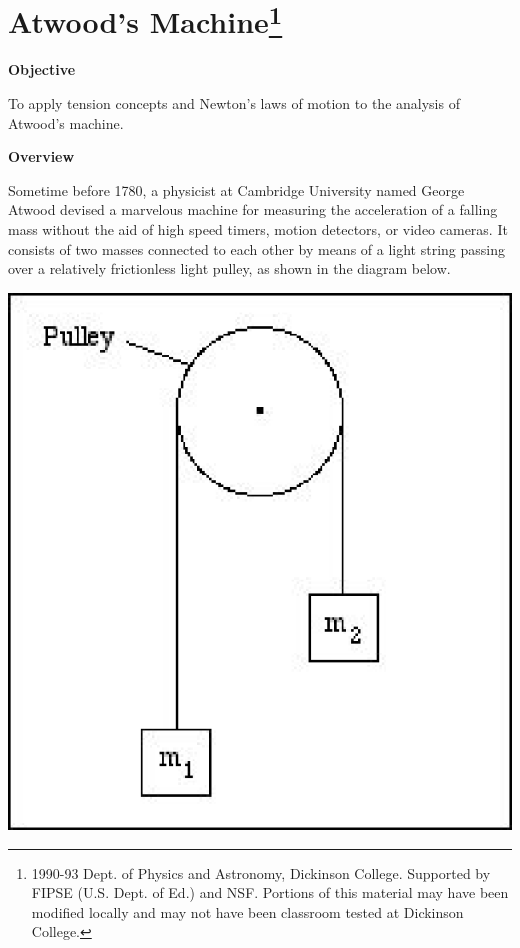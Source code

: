 
\section{Atwood's Machine\footnote{
1990-93 Dept. of Physics and Astronomy, Dickinson College. Supported by FIPSE
(U.S. Dept. of Ed.) and NSF. Portions of this material may have been modified
locally and may not have been classroom tested at Dickinson College.
}}

\makelabheader %

\textbf{Objective }

To apply tension concepts and Newton's laws of motion to the analysis of Atwood's
machine.

\textbf{Overview }

Sometime before 1780, a physicist at Cambridge University named George Atwood
devised a marvelous machine for measuring the acceleration of a falling mass
without the aid of high speed timers, motion detectors, or video cameras. It
consists of two masses connected to each other by means of a light string passing
over a relatively frictionless light pulley, as shown in the diagram below.

\vspace{0.3cm}
{\par\centering \includegraphics{atwood_fig1.eps} \par}
\vspace{0.3cm}

